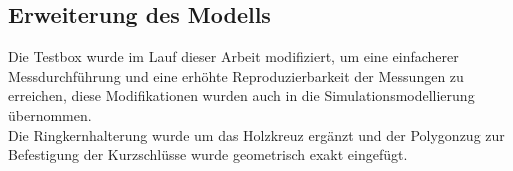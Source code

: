         \subsection{Erweiterung des Modells}
        Die Testbox wurde im Lauf dieser Arbeit modifiziert, um eine einfacherer Messdurchführung und eine erhöhte Reproduzierbarkeit der Messungen zu erreichen, diese Modifikationen wurden auch in die Simulationsmodellierung übernommen.\\
        Die Ringkernhalterung wurde um das Holzkreuz ergänzt und der Polygonzug zur Befestigung der Kurzschlüsse wurde geometrisch exakt eingefügt.\\

